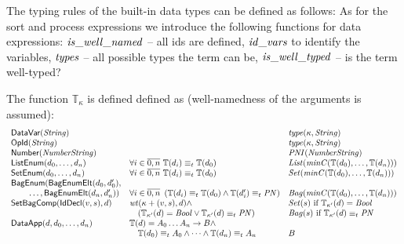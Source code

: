 \documentclass[fleqn,a4paper,dvips]{article}
\newcommand{\aterm}[1]{\mathsf{#1}}
\newcommand{\type}{\mathbb{T}}
\newcommand{\PNI}{\nm{PNI}}
\newcommand{\PN}{\nm{PN}}
\newcommand{\List}{\nm{List}}
\newcommand{\Set}{\nm{Set}}
\newcommand{\Bag}{\nm{Bag}}
\newcommand{\typecompat}{\equiv_t}
\newcommand{\wt}{\nm{wt}}
\begin{document}
The typing rules of the built-in data types can be defined as follows:
As for the sort and process expressions we introduce the following functions for data
expressions: $\mathit{is\_well\_named}$ -- all ids are defined, $\mathit{id\_vars}$ to identify 
the variables, $\mathit{types}$ -- all possible types the term can be, 
$\mathit{is\_well\_typed}$ -- is the term well-typed?

The function $\type_\kappa$ is defined defined as (well-namedness of the arguments is assumed):
\begin{displaymath}
\begin{array}{lll}
\aterm{DataVar}(\nm{String})         &                                                            & \nm{type}(\kappa,\nm{String})\\
\aterm{OpId}(\nm{String})            &                                                            & \nm{type}(\kappa,\nm{String})\\
\aterm{Number}(\nm{NumberString})    &                                                            & \PNI(\nm{NumberString})\\
\aterm{ListEnum}(d_0,\dots, d_n)     & \forall i\in\overline{0,n}~\type(d_i)\typecompat\type(d_0) & \List(\nm{minC}(\type(d_0),\dots,\type(d_n)))\\
\aterm{SetEnum}(d_0,\dots, d_n)      & \forall i\in\overline{0,n}~\type(d_i)\typecompat\type(d_0) & \Set(\nm{minC}(\type(d_0),\dots,\type(d_n)))\\ 
\aterm{BagEnum}(\aterm{BagEnumElt}(d_0,d_0'),\\
\t2\dots,\aterm{BagEnumElt}(d_n,d_n'))
                                     & \forall i\in\overline{0,n}~\left(\type(d_i)\typecompat\type(d_0)\land\type(d_i')\typecompat\PN\right) 
                                                                                                  & \Bag(\nm{minC}(\type(d_0),\dots,\type(d_n)))\\ 
\aterm{SetBagComp}(\aterm{IdDecl}(v,s),d) 
                                     & \wt(\kappa+(v,s),d)\land                                   & \Set(s)~\text{if}~\type_{\kappa'}(d)=\Bool \\
                                     &\t1(\type_{\kappa'}(d)=\Bool\lor\type_{\kappa'}(d)\typecompat\PN)               & \Bag(s)~\text{if}~\type_{\kappa'}(d)\typecompat\PN\\ 
\aterm{DataApp}(d, d_0,\dots,d_n)    & \type(d)=A_0 \dots A_n\to B\land\\
                                     & \t1\type(d_0)\typecompat A_0\land\dots\land\type(d_n)\typecompat A_n & B\\

\end{array}
\end{displaymath}
\end{document}
